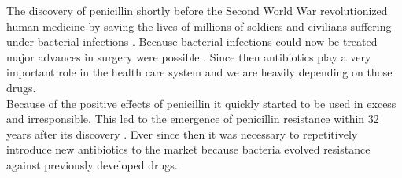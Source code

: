 The discovery of penicillin shortly before the Second World War revolutionized human medicine by saving the lives of millions of soldiers and civilians suffering under bacterial infections \cite{cdc_biggest_2019}. Because bacterial infections could now be treated major advances in surgery were possible \cite{worldwar_resistance}. Since then antibiotics play a very important role in the health care system and we are heavily depending on those drugs.\\
Because of the positive effects of penicillin it quickly started to be used in excess and irresponsible. This led to the emergence of penicillin resistance within 32 years after its discovery \cite{worldwar_resistance}.
Ever since then it was necessary to repetitively introduce new antibiotics to the market because bacteria evolved resistance against previously developed drugs. 

